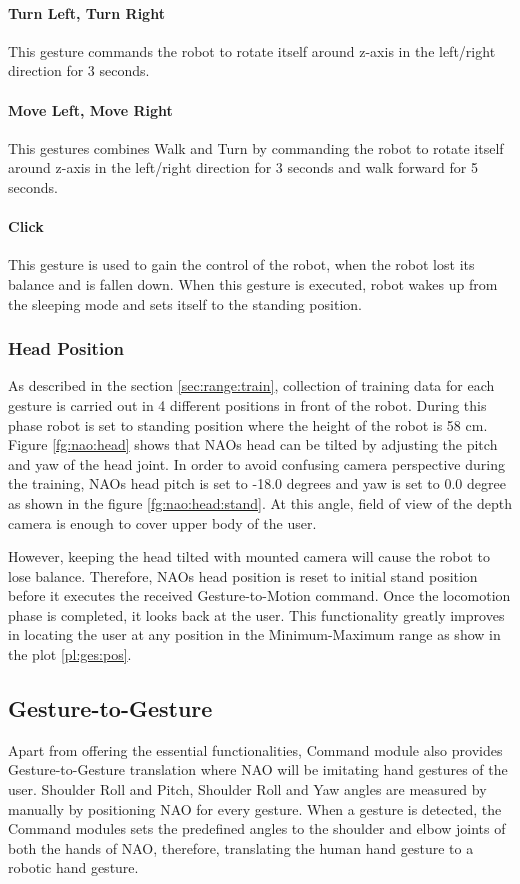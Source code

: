 \paragraph*{Turn Left, Turn Right} This gesture commands the robot to rotate itself around z-axis in the left/right direction for 3 seconds.

\paragraph*{Move Left, Move Right} This gestures combines Walk and Turn by commanding the robot to rotate itself around z-axis in the left/right direction for 3 seconds and walk forward for 5 seconds.

\paragraph*{Click} This gesture is used to gain the control of the robot, when the robot lost its balance and is fallen down. When this gesture is executed, robot wakes up from the sleeping mode and sets itself to the standing position.



\subsubsection*{Head Position} As described in the section \ref{sec:range:train}, collection of training data for each gesture is carried out in 4 different positions in front of the robot. During this phase robot is set to standing position where the height of the robot is 58 cm. Figure \ref{fg:nao:head} shows that NAOs head can be tilted by adjusting the pitch and yaw of the head joint. In order to avoid confusing camera perspective during the training, NAOs head pitch is set to -18.0 degrees and yaw is set to 0.0 degree as shown in the figure \ref{fg:nao:head:stand}. At this angle, field of view of the depth camera is enough to cover upper body of the user. 

However, keeping the head tilted with mounted camera will cause the robot to lose balance. Therefore, NAOs head position is reset to initial stand position before it executes the received Gesture-to-Motion command. Once the locomotion phase is completed, it looks back at the user. This functionality greatly improves in locating the user at any position in the Minimum-Maximum range as show in the plot \ref{pl:ges:pos}.

\subsection{Gesture-to-Gesture} Apart from offering the essential functionalities, Command module also provides Gesture-to-Gesture translation where NAO will be imitating hand gestures of the user. Shoulder Roll and Pitch, Shoulder Roll and Yaw angles are measured by manually by positioning NAO for every gesture. When a gesture is detected, the Command modules sets the predefined angles to the shoulder and elbow joints of both the hands of NAO, therefore, translating the human hand gesture to a robotic hand gesture.
